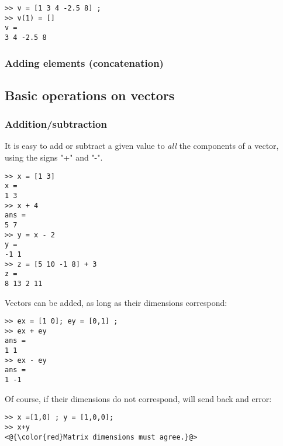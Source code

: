\begin{lstlisting}
>> v = [1 3 4 -2.5 8] ;
>> v(1) = []
v = 
3 4 -2.5 8
\end{lstlisting}


\subsubsection{Adding elements (concatenation)}


\subsection{Basic operations on vectors}
\subsubsection{Addition/subtraction}
It is easy to add or subtract a given value to \emph{all} the components of a vector, using the signs "+" and "-".

\begin{lstlisting}
>> x = [1 3]
x = 
1 3
>> x + 4
ans =
5 7
>> y = x - 2
y =
-1 1
>> z = [5 10 -1 8] + 3
z = 
8 13 2 11
\end{lstlisting}


Vectors can be added, as long as their dimensions correspond:

\begin{lstlisting}
>> ex = [1 0]; ey = [0,1] ;
>> ex + ey
ans =
1 1
>> ex - ey
ans =
1 -1
\end{lstlisting}

Of course, if their dimensions do not correspond, \matlab will send back and error:

\begin{lstlisting}
>> x =[1,0] ; y = [1,0,0];
>> x+y
<@{\color{red}Matrix dimensions must agree.}@>
\end{lstlisting}




